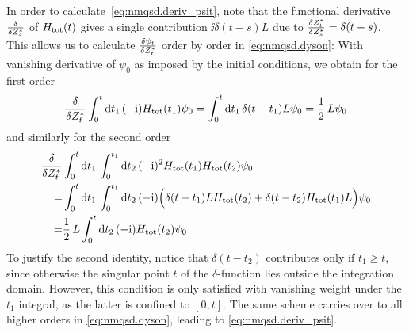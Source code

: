 In order to calculate~\ref{eq:nmqsd.deriv_psit}, note that the functional derivative $\frac{\delta}{\delta {Z}^*_s}$ of $H_\mathrm{tot}(t)$ gives a single contribution $\ii \delta(t - s) L$ due to $\frac{\delta {Z}^*_t}{\delta {Z}^*_s} = \delta(t - s)$.
This allows us to calculate $\frac{\delta \psi_t}{\delta {Z}^*_t}$ order by order in \autoref{eq:nmqsd.dyson}:
With vanishing derivative of $\psi_0$ as imposed by the initial conditions, we obtain for the first order
\begin{equation*}
  \frac{\delta}{\delta{Z}^*_t} \int_{0}^{t}\mathrm{d}t_1\, (-\mathrm{i}) H_\mathrm{tot}(t_1) \psi_0 = \int_{0}^{t}\mathrm{d}t_1\, \delta(t - t_1) L \psi_0 = \frac{1}{2} \, L \psi_0
\end{equation*}
and similarly for the second order
\begin{align*}
  \frac{\delta}{\delta{Z}^*_t} &\int_{0}^{t}\mathrm{d}t_1\,\int_{0}^{t_1}\mathrm{d}t_2\, (-\mathrm{i})^2 H_\mathrm{tot}(t_1)H_\mathrm{tot}(t_2)\psi_0 \\
  =&\int_{0}^{t}\mathrm{d}t_1\,\int_{0}^{t_1}\mathrm{d}t_2\, (-\mathrm{i}) \Big( \delta(t - t_1)L H_\mathrm{tot}(t_2) + \delta(t - t_2) H_\mathrm{tot}(t_1) L \Big)\psi_0 \\
  =& \frac{1}{2}\,L \int_{0}^{t}\mathrm{d}t_2\, (-\mathrm{i}) H_\mathrm{tot}(t_2)\psi_0
\end{align*}
To justify the second identity, notice that $\delta(t - t_2)$ contributes only if $t_1 \ge t$, since otherwise the singular point $t$ of the $\delta$-function lies outside the integration domain.
However, this condition is only satisfied with vanishing weight under the $t_1$ integral, as the latter is confined to $[0,t]$.
The same scheme carries over to all higher orders in \autoref{eq:nmqsd.dyson}, leading to \autoref{eq:nmqsd.deriv_psit}.\\



